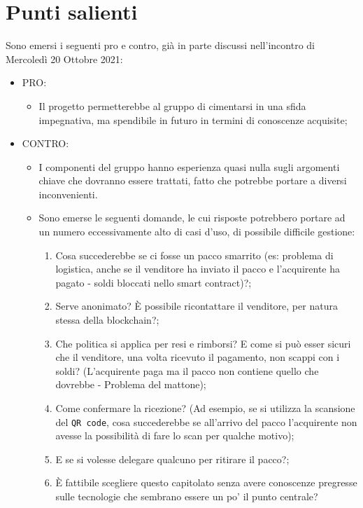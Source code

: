 \documentclass[11pt]{article}
\begin{document}
	\section{Punti salienti}
		Sono emersi i seguenti pro e contro, già in parte discussi nell'incontro di Mercoledì 20 Ottobre 2021:
		\begin{itemize}
			\item PRO:
			\begin{itemize}
				\item Il progetto permetterebbe al gruppo di cimentarsi in una sfida impegnativa, ma spendibile in futuro
				in termini di conoscenze acquisite;
			\end{itemize}
			\item CONTRO:
				\begin{itemize}
				\item I componenti del gruppo hanno esperienza quasi nulla sugli argomenti chiave che dovranno essere
				trattati, fatto che potrebbe portare a diversi inconvenienti.
				\item Sono emerse le seguenti domande, le cui risposte potrebbero portare ad un numero eccessivamente
				alto di casi d'uso, di possibile difficile gestione:
				\begin{enumerate}
					\item Cosa succederebbe se ci fosse un pacco smarrito (es: problema di logistica, anche se il venditore
					ha inviato il pacco e l'acquirente ha pagato - soldi bloccati nello smart contract)?;
					\item Serve anonimato? È possibile ricontattare il venditore, per natura stessa della blockchain?;
					\item Che politica si applica per resi e rimborsi? E come si può esser sicuri che il venditore, una volta
					ricevuto il pagamento, non scappi con i soldi? (L'acquirente paga ma il pacco non contiene quello che dovrebbe -
					Problema del mattone);
					\item Come confermare la ricezione? (Ad esempio, se si utilizza la scansione del \texttt{QR code}, cosa
					succederebbe se all'arrivo del pacco l'acquirente non avesse la possibilità di fare lo scan per qualche motivo);
					\item E se si volesse delegare qualcuno per ritirare il pacco?;
					\item È fattibile scegliere questo capitolato senza avere conoscenze pregresse sulle tecnologie che
					sembrano essere un po' il punto centrale?
				\end{enumerate}
			\end{itemize}
		\end{itemize}
\end{document}
